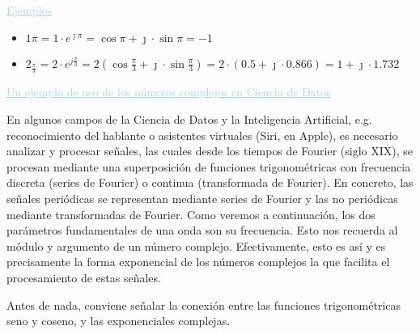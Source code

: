 \documentclass[12pt]{article}
\begin{document}
\textcolor{lightblue}{\underline{Ejemplos}}

\begin{multicols}{2}
    \begin{itemize}
        \item $1\pi=1\cdot e^{\jmath\pi}=\cos\pi+\jmath \cdot\sin\pi=-1$
    \end{itemize}
    \columnbreak
    \begin{itemize}
\item $2_{\frac{\pi}{3}}=2\cdot
e^{j\frac{\pi}{3}}=2(\cos\frac{\pi}{3}+\jmath \cdot\sin\frac{\pi}{3})=2\cdot(0.5+\jmath \cdot0.866)=1+\jmath \cdot1.732$
    \end{itemize}
\end{multicols}
\textcolor{lightblue}{\underline{Un ejemplo de uso de los
números complejos en Ciencia de Datos}}

En algunos campos de la Ciencia de Datos y la Inteligencia
Artificial, e.g. reconocimiento del hablante o asistentes
virtuales (Siri, en Apple), es necesario analizar y procesar
señales, las cuales desde los tiempos de Fourier (siglo XIX), se
procesan mediante una superposición de funciones trigonométricas
con frecuencia discreta (series de Fourier) o continua
(transformada de Fourier). En concreto, las señales periódicas
se representan mediante series de Fourier y las no periódicas
mediante transformadas de Fourier. Como veremos a continuación,
los dos parámetros fundamentales de una onda son su frecuencia.
Esto nos recuerda al módulo y argumento de un número complejo.
Efectivamente, esto es así y es precisamente la forma
exponencial de los números complejos la que facilita el
procesamiento de estas señales.

Antes de nada, conviene señalar la conexión entre las funciones
trigonométricas seno y coseno, y las exponenciales complejas.
\end{document}
